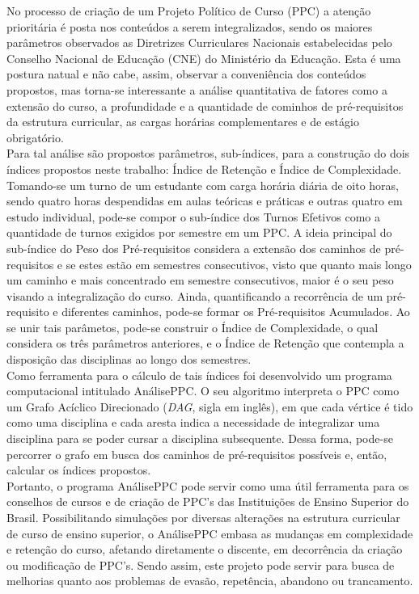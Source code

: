 \documentclass[a4paper, 12pt]{article}
\begin{document}
No processo de criação de um Projeto Político de Curso (PPC) a atenção prioritária é posta nos conteúdos a serem integralizados, sendo os maiores parâmetros 
observados as Diretrizes Curriculares Nacionais estabelecidas pelo Conselho Nacional de Educação (CNE) do Ministério da Educação. Esta é uma postura natual e 
não cabe, assim, observar a conveniência dos conteúdos propostos, mas torna-se interessante a análise quantitativa de fatores como a extensão do curso, a 
profundidade e a quantidade de cominhos de pré-requisitos da estrutura curricular, as cargas horárias complementares e de estágio obrigatório. \\

Para tal análise são propostos parâmetros, sub-índices, para a construção do dois índices propostos neste trabalho: Índice de Retenção e Índice de Complexidade. 
Tomando-se um turno de um estudante com carga horária diária de oito horas, sendo quatro horas despendidas em aulas teóricas e práticas e outras quatro em 
estudo individual, pode-se compor o sub-índice dos Turnos Efetivos como a quantidade de turnos exigidos por semestre em um PPC. A ideia principal do 
sub-índice do Peso dos Pré-requisitos considera a extensão dos caminhos de pré-requisitos e se estes estão em semestres consecutivos, visto que quanto mais 
longo um caminho e mais concentrado em semestre consecutivos, maior é o seu peso visando a integralização do curso. Ainda, quantificando a recorrência de um 
pré-requisito e diferentes caminhos, pode-se formar os Pré-requisitos Acumulados. Ao se unir tais parâmetos, pode-se construir o Índice de Complexidade, 
o qual considera os três parâmetros anteriores, e o Índice de Retenção que contempla a disposição das disciplinas ao longo dos semestres. \\

Como ferramenta para o cálculo de tais índices foi desenvolvido um programa computacional intitulado AnálisePPC. O seu algoritmo interpreta o PPC como 
um Grafo Acíclico Direcionado (\textit{DAG}, sigla em inglês), em que cada vértice é tido como uma disciplina e cada aresta indica a necessidade de integralizar 
uma disciplina para se poder cursar a disciplina subsequente. Dessa forma, pode-se percorrer o grafo em busca dos caminhos de pré-requisitos possíveis e, então, 
calcular os índices propostos. \\

Portanto, o programa AnálisePPC pode servir como uma útil ferramenta para os conselhos de cursos e de criação de PPC's das Instituições de Ensino Superior 
do Brasil. Possibilitando simulações por diversas alterações na estrutura curricular de curso de ensino superior, o AnálisePPC embasa as mudanças em complexidade e 
retenção do curso, afetando diretamente o discente, em decorrência da criação ou modificação de PPC's. Sendo assim, este projeto pode servir para 
busca de melhorias quanto aos problemas de evasão, repetência, abandono ou trancamento.
\end{document}
